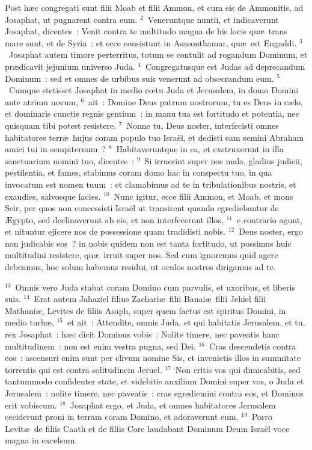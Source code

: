\bchapter
\lettrine[lines=3,image=true,loversize=0.05,lraise=-0.03]{P}{}ost h\ae c congregati sunt filii Moab et filii Ammon, et cum eis de Ammonitis, ad Josaphat, ut pugnarent contra eum.
${}^{2}$~Veneruntque nuntii, et indicaverunt Josaphat, dicentes~: Venit contra te multitudo magna de his locis qu\ae\ trans mare sunt, et de Syria~: et ecce consistunt in Asasonthamar, qu\ae\ est Engaddi.
${}^{3}$~Josaphat autem timore perterritus, totum se contulit ad rogandum Dominum, et pr\ae dicavit jejunium universo Juda.
${}^{4}$~Congregatusque est Judas ad deprecandum Dominum~: sed et omnes de urbibus suis venerunt ad obsecrandum eum.
${}^{5}$~Cumque stetisset Josaphat in medio cœtu Juda et Jerusalem, in domo Domini ante atrium novum,
${}^{6}$~ait~: Domine Deus patrum nostrorum, tu es Deus in c\ae lo, et dominaris cunctis regnis gentium~: in manu tua est fortitudo et potentia, nec quisquam tibi potest resistere.
${}^{7}$~Nonne tu, Deus noster, interfecisti omnes habitatores terr\ae\ hujus coram populo tuo Isra\"el, et dedisti eam semini Abraham amici tui in sempiternum~?
${}^{8}$~Habitaveruntque in ea, et exstruxerunt in illa sanctuarium nomini tuo, dicentes~:
${}^{9}$~Si irruerint super nos mala, gladius judicii, pestilentia, et fames, stabimus coram domo hac in conspectu tuo, in qua invocatum est nomen tuum~: et clamabimus ad te in tribulationibus nostris, et exaudies, salvosque facies.
${}^{10}$~Nunc igitur, ecce filii Ammon, et Moab, et mons Seir, per quos non concessisti Isra\"el ut transirent quando egrediebantur de \AE gypto, sed declinaverunt ab eis, et non interfecerunt illos,
${}^{11}$~e contrario agunt, et nituntur ejicere nos de possessione quam tradidisti nobis.
${}^{12}$~Deus noster, ergo non judicabis eos~? in nobis quidem non est tanta fortitudo, ut possimus huic multitudini resistere, qu\ae\ irruit super nos. Sed cum ignoremus quid agere debeamus, hoc solum habemus residui, ut oculos nostros dirigamus ad te.


${}^{13}$~Omnis vero Juda stabat coram Domino cum parvulis, et uxoribus, et liberis suis.
${}^{14}$~Erat autem Jahaziel filius Zachari\ae\ filii Banai\ae\ filii Jehiel filii Mathani\ae , Levites de filiis Asaph, super quem factus est spiritus Domini, in medio turb\ae ,
${}^{15}$~et ait~: Attendite, omnis Juda, et qui habitatis Jerusalem, et tu, rex Josaphat~: h\ae c dicit Dominus vobis~: Nolite timere, nec paveatis hanc multitudinem~: non est enim vestra pugna, sed Dei.
${}^{16}$~Cras descendetis contra eos~: ascensuri enim sunt per clivum nomine Sis, et invenietis illos in summitate torrentis qui est contra solitudinem Jeruel.
${}^{17}$~Non eritis vos qui dimicabitis, sed tantummodo confidenter state, et videbitis auxilium Domini super vos, o Juda et Jerusalem~: nolite timere, nec paveatis~: cras egrediemini contra eos, et Dominus erit vobiscum.
${}^{18}$~Josaphat ergo, et Juda, et omnes habitatores Jerusalem ceciderunt proni in terram coram Domino, et adoraverunt eum.
${}^{19}$~Porro Levit\ae\ de filiis Caath et de filiis Core laudabant Dominum Deum Isra\"el voce magna in excelsum.


